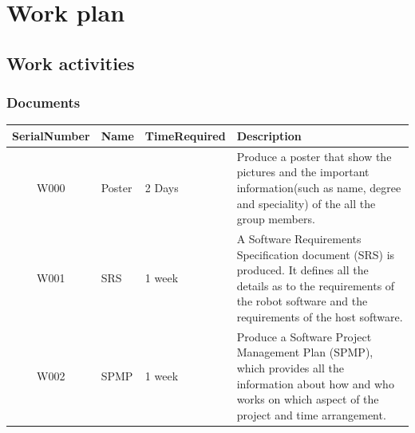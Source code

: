 \documentclass[11pt, a4paper]{report}
\begin{document}
\chapter{Work plan}



\section{Work activities}



\subsection{Documents}
\begin{tabular}{|c|p{1cm}|p{3cm}|p{7cm}|}%
\hline
\centering SerialNumber     &	Name 	&	TimeRequired		&	Description	       											\\ \hline
W000 & Poster & 2 Days & Produce a poster that show the pictures and the important
information(such as name, degree and  speciality) of the all the group members.  \\ \hline

W001		&	SRS	&	1 week	&	A Software Requirements Specification document (SRS) is produced. It defines all the details as to the requirements of the robot software and the requirements of the host software.  \\ \hline
W002		&	SPMP	&	1 week	&	Produce a Software Project Management Plan (SPMP), which provides all the information about how and who works on which aspect of the project and time arrangement. \\ \hline	
\end{tabular}


\end{document}
